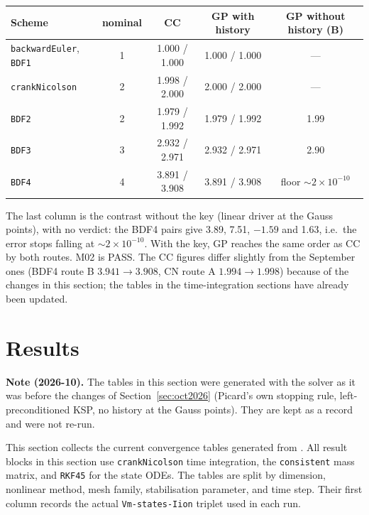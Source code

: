 \documentclass[11pt,a4paper]{article}
\newcommand{\code}[1]{\texttt{\small #1}}
\begin{document}
\begin{center}
\begin{tabular}{@{}lcccc@{}}
\toprule
Scheme & nominal & CC & GP with history & GP without history (B) \\
\midrule
\code{backwardEuler}, \code{BDF1} & 1 & 1.000 / 1.000 & 1.000 / 1.000 & --- \\
\code{crankNicolson} & 2 & 1.998 / 2.000 & 2.000 / 2.000 & --- \\
\code{BDF2} & 2 & 1.979 / 1.992 & 1.979 / 1.992 & 1.99 \\
\code{BDF3} & 3 & 2.932 / 2.971 & 2.932 / 2.971 & 2.90 \\
\code{BDF4} & 4 & 3.891 / 3.908 & 3.891 / 3.908 & floor $\sim2\times10^{-10}$ \\
\bottomrule
\end{tabular}
\end{center}

The last column is the contrast without the key (linear driver at the Gauss
points), with no verdict: the BDF4 pairs give 3.89, 7.51, $-1.59$ and 1.63, i.e.\
the error stops falling at $\sim2\times10^{-10}$. With the key, GP reaches the same
order as CC by both routes. M02 is PASS. The CC figures differ slightly from the
September ones (BDF4 route B $3.941\to3.908$, CN route A $1.994\to1.998$) because
of the changes in this section; the tables in the time-integration sections have
already been updated.

\section{Results}
\label{sec:mms-results}

\textbf{Note (2026-10).} The tables in this section were generated with the solver
as it was before the changes of Section~\ref{sec:oct2026} (Picard's own stopping
rule, left-preconditioned KSP, no history at the Gauss points). They are kept as a
record and were not re-run.

This section collects the current convergence tables generated from
.
All result blocks in this section use \code{crankNicolson} time integration,
the \code{consistent} mass matrix, and \code{RKF45} for the state ODEs. The
tables are split by dimension, nonlinear method, mesh family, stabilisation
parameter, and time step. Their first column records the actual
\code{Vm-states-Iion} triplet used in each run.
\end{document}
